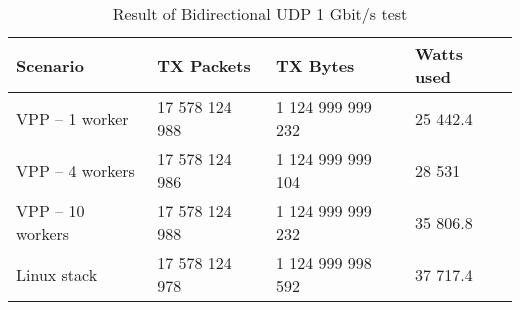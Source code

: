 \begin{table}[h!]
\centering
\begin{tabular}{|l|l|l|l|}
\hline
\textbf{Scenario} & \textbf{TX Packets} & \textbf{TX Bytes} & \textbf{Watts used} \\
\hline
VPP -- 1 worker & 17 578 124 988 & 1 124 999 999 232 & 25 442.4 \\
VPP -- 4 workers & 17 578 124 986 & 1 124 999 999 104 & 28 531 \\
VPP -- 10 workers &  17 578 124 988 & 1 124 999 999 232 & 35 806.8 \\
Linux stack & 17 578 124 978 & 1 124 999 998 592 & 37 717.4 \\
\hline
\end{tabular}
\caption{Result of Bidirectional UDP 1 Gbit/s test}
\label{tab:udp:one}
\end{table}




